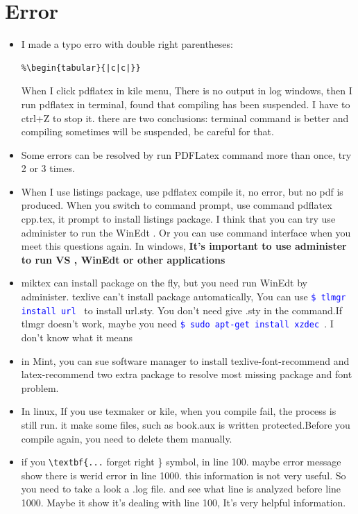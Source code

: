 \documentclass[a4paper,12pt,twoside]{book}
\newcommand{\linuxcommand}[1]{\texttt{\textcolor{blue}{\$ #1 \Pisymbol{psy}{191}}}}
\begin{document}
\section{Error}
\begin{itemize}
 \item I made a typo erro with double right parentheses:
\begin{verbatim}
%\begin{tabular}{|c|c|}}
\end{verbatim}
 

  When I click pdflatex in kile menu, There is no output in log windows, then I run pdflatex in terminal,
  found that compiling has been suspended. I have to ctrl+Z to stop it. there are two conclusions: terminal command is better and compiling sometimes will be suspended, be careful for that.
 \item Some errors can be resolved by run PDFLatex command more than once, try 2 or 3 times.
 \item When I use listings package, use pdflatex compile it, no error, but no pdf is produced. When you switch to command prompt, use command pdflatex cpp.tex, it prompt to install listings package. I think that you can try use administer to run the WinEdt . Or you can use command interface when you meet this questions again. In windows, \textbf{It's important to use administer to run VS , WinEdt  or other applications}
\item miktex can install package on the fly, but you need run WinEdt by administer. texlive can't install package automatically, You can use \linuxcommand{tlmgr install url} to install url.sty. You don't need give .sty in the command.If tlmgr doesn't work,  maybe you need \linuxcommand{sudo apt-get install xzdec}. I don't know what it means
    \item  in Mint, you can sue software manager to install texlive-font-recommend and latex-recommend two extra package to resolve most missing package and font problem.
    \item In linux, If you use texmaker or kile, when you compile fail,  the process is still run. it make some files, such as  book.aux is written protected.Before you compile again, you need to delete them manually.
    \item if you \verb=\textbf{...= forget right \} symbol, in line 100. maybe error message show there is werid error in line 1000. this information is not very useful. So you need to take a look a .log file. and see what line is analyzed  before line 1000. Maybe it show it's dealing with line 100, It's very helpful information. 
\end{itemize}



\ifx \allfiles \undefined

\end{document}
